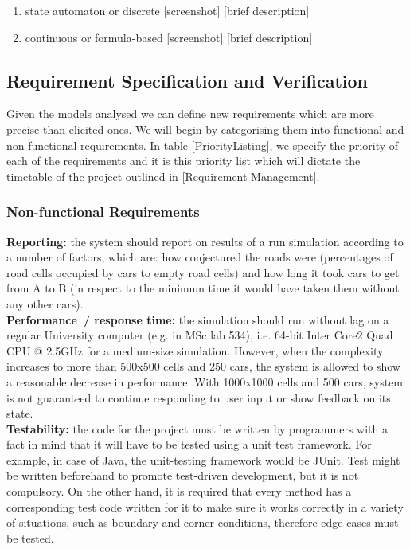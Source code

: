 \documentclass{article}
\begin{document}
\begin{enumerate}
	
	\item state automaton or discrete
	[screenshot] [brief description]
	\item continuous or formula-based
	[screenshot] [brief description]

\end{enumerate}

\subsection{Requirement Specification and Verification}

Given the models analysed we can define new requirements which are more precise than elicited ones. We will begin by categorising them into functional and non-functional requirements. In table \ref{PriorityListing}, we specify the priority of each of the requirements and it is this priority list which will dictate the timetable of the project outlined in \ref{Requirement Management}.\\

\subsubsection{Non-functional Requirements}
\textbf{Reporting:} the system should report on results of a run simulation according to a number of factors, which are: how conjectured the roads were (percentages of road cells occupied by cars to empty road cells) and how long it took cars to get from A to B (in respect to the minimum time it would have taken them without any other cars).\\

\noindent
\textbf{Performance / response time:} the simulation should run without lag on a regular University computer (e.g. in MSc lab 534), i.e. 64-bit Inter Core2 Quad CPU @ 2.5GHz for a medium-size simulation. However, when the complexity increases to more than 500x500 cells and 250 cars, the system is allowed to show a reasonable decrease in performance. With 1000x1000 cells and 500 cars, system is not guaranteed to continue responding to user input or show feedback on its state.\\

\noindent
\textbf{Testability:} the code for the project must be written by programmers with a fact in mind that it will have to be tested using a unit test framework. For example, in case of Java, the unit-testing framework would be JUnit. Test might be written beforehand to promote test-driven development, but it is not compulsory. On the other hand, it is required that every method has a corresponding test code written for it to make sure it works correctly in a variety of situations, such as boundary and corner conditions, therefore edge-cases must be tested.\\
\end{document}
